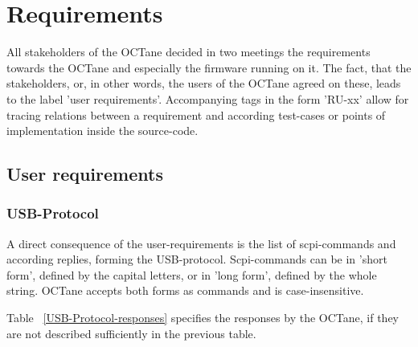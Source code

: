 	\chapter{Requirements}
	\label{cha:Requirements}
		All stakeholders of the OCTane decided in two meetings the requirements towards the OCTane and especially the firmware running on it. The fact, that the stakeholders, or, in other words, the users of the OCTane agreed on these, leads to the label 'user requirements'. Accompanying tags in the form 'RU-xx' allow for tracing relations between a requirement and according test-cases or points of implementation inside the source-code. %
		\section{User requirements}
				
		\pagebreak
			\subsection{USB-Protocol}
		A direct consequence of the user-requirements is the list of scpi-commands and according replies, forming the USB-protocol.	Scpi-commands can be in 'short form', defined by the capital letters, or in 'long form', defined by the whole string. OCTane accepts both forms as commands and is case-insensitive. \cite{scpi1993}
		{	\scriptsize
			
		}
		Table ~\ref{USB-Protocol-responses} specifies the responses by the OCTane, if they are not described sufficiently in the previous table.
		{	\scriptsize
			
		}
			
